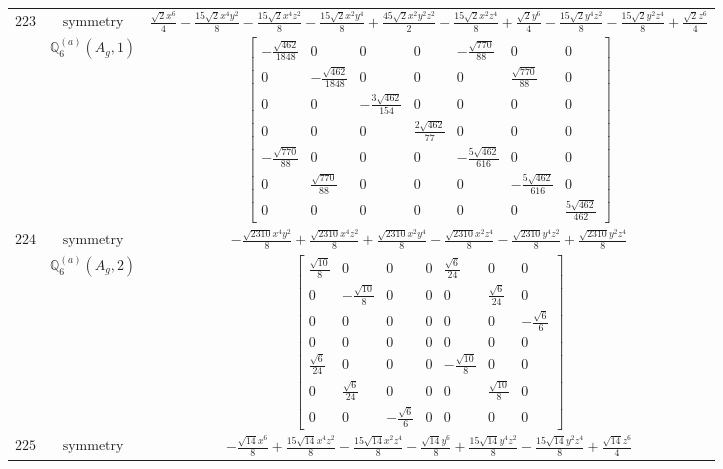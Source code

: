 \documentclass[fleqn,8pt,landscape]{jsarticle}
\begin{document}
\begin{longtable}{ccc}
$ 223 $ & $ \text{symmetry} $ & $ \frac{\sqrt{2} x^{6}}{4} - \frac{15 \sqrt{2} x^{4} y^{2}}{8} - \frac{15 \sqrt{2} x^{4} z^{2}}{8} - \frac{15 \sqrt{2} x^{2} y^{4}}{8} + \frac{45 \sqrt{2} x^{2} y^{2} z^{2}}{2} - \frac{15 \sqrt{2} x^{2} z^{4}}{8} + \frac{\sqrt{2} y^{6}}{4} - \frac{15 \sqrt{2} y^{4} z^{2}}{8} - \frac{15 \sqrt{2} y^{2} z^{4}}{8} + \frac{\sqrt{2} z^{6}}{4} $ \\
$  $ & $ \mathbb{Q}_{6}^{(a)}(A_{g},1) $ & $ \begin{bmatrix} - \frac{\sqrt{462}}{1848} & 0 & 0 & 0 & - \frac{\sqrt{770}}{88} & 0 & 0 \\ 0 & - \frac{\sqrt{462}}{1848} & 0 & 0 & 0 & \frac{\sqrt{770}}{88} & 0 \\ 0 & 0 & - \frac{3 \sqrt{462}}{154} & 0 & 0 & 0 & 0 \\ 0 & 0 & 0 & \frac{2 \sqrt{462}}{77} & 0 & 0 & 0 \\ - \frac{\sqrt{770}}{88} & 0 & 0 & 0 & - \frac{5 \sqrt{462}}{616} & 0 & 0 \\ 0 & \frac{\sqrt{770}}{88} & 0 & 0 & 0 & - \frac{5 \sqrt{462}}{616} & 0 \\ 0 & 0 & 0 & 0 & 0 & 0 & \frac{5 \sqrt{462}}{462} \end{bmatrix} $ \\ \hline
$ 224 $ & $ \text{symmetry} $ & $ - \frac{\sqrt{2310} x^{4} y^{2}}{8} + \frac{\sqrt{2310} x^{4} z^{2}}{8} + \frac{\sqrt{2310} x^{2} y^{4}}{8} - \frac{\sqrt{2310} x^{2} z^{4}}{8} - \frac{\sqrt{2310} y^{4} z^{2}}{8} + \frac{\sqrt{2310} y^{2} z^{4}}{8} $ \\
$  $ & $ \mathbb{Q}_{6}^{(a)}(A_{g},2) $ & $ \begin{bmatrix} \frac{\sqrt{10}}{8} & 0 & 0 & 0 & \frac{\sqrt{6}}{24} & 0 & 0 \\ 0 & - \frac{\sqrt{10}}{8} & 0 & 0 & 0 & \frac{\sqrt{6}}{24} & 0 \\ 0 & 0 & 0 & 0 & 0 & 0 & - \frac{\sqrt{6}}{6} \\ 0 & 0 & 0 & 0 & 0 & 0 & 0 \\ \frac{\sqrt{6}}{24} & 0 & 0 & 0 & - \frac{\sqrt{10}}{8} & 0 & 0 \\ 0 & \frac{\sqrt{6}}{24} & 0 & 0 & 0 & \frac{\sqrt{10}}{8} & 0 \\ 0 & 0 & - \frac{\sqrt{6}}{6} & 0 & 0 & 0 & 0 \end{bmatrix} $ \\ \hline
$ 225 $ & $ \text{symmetry} $ & $ - \frac{\sqrt{14} x^{6}}{8} + \frac{15 \sqrt{14} x^{4} z^{2}}{8} - \frac{15 \sqrt{14} x^{2} z^{4}}{8} - \frac{\sqrt{14} y^{6}}{8} + \frac{15 \sqrt{14} y^{4} z^{2}}{8} - \frac{15 \sqrt{14} y^{2} z^{4}}{8} + \frac{\sqrt{14} z^{6}}{4} $ \\

\end{longtable}
\end{document}
